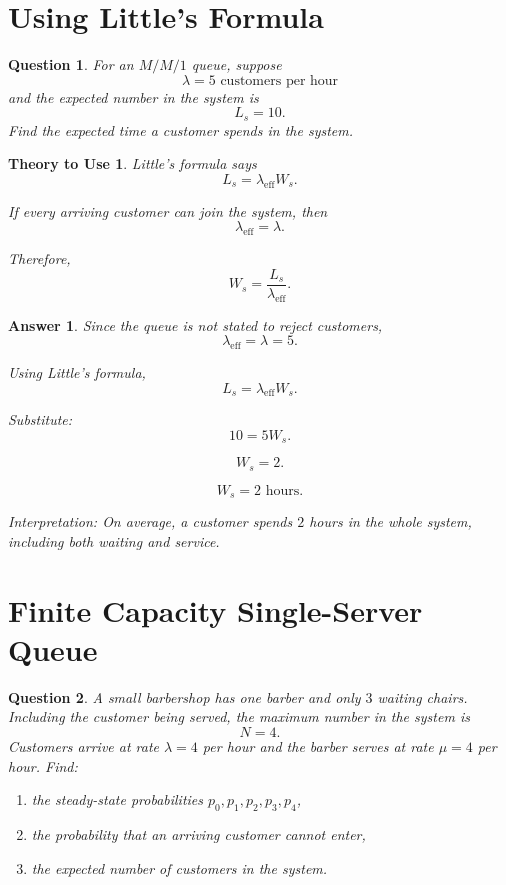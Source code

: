 \documentclass[12pt]{article}
\newtheorem{question}{Question}
\newtheorem*{theory}{Theory to Use}
\newtheorem*{answer}{Answer}
\begin{document}
\section{Using Little's Formula}

\begin{question}
For an \(M/M/1\) queue, suppose
\[
\lambda=5\text{ customers per hour}
\]
and the expected number in the system is
\[
L_s=10.
\]
Find the expected time a customer spends in the system.
\end{question}

\begin{theory}
Little's formula says
\[
L_s=\lambda_{\text{eff}}W_s.
\]

If every arriving customer can join the system, then
\[
\lambda_{\text{eff}}=\lambda.
\]

Therefore,
\[
W_s=\frac{L_s}{\lambda_{\text{eff}}}.
\]
\end{theory}

\begin{answer}
Since the queue is not stated to reject customers,
\[
\lambda_{\text{eff}}=\lambda=5.
\]

Using Little's formula,
\[
L_s=\lambda_{\text{eff}}W_s.
\]

Substitute:
\[
10=5W_s.
\]

\[
W_s=2.
\]

\[
\boxed{W_s=2\text{ hours}.}
\]

Interpretation: On average, a customer spends \(2\) hours in the whole system, including both waiting and service.
\end{answer}

\section{Finite Capacity Single-Server Queue}

\begin{question}
A small barbershop has one barber and only \(3\) waiting chairs.
Including the customer being served, the maximum number in the system is
\[
N=4.
\]
Customers arrive at rate \(\lambda=4\) per hour and the barber serves at rate \(\mu=4\) per hour.
Find:
\begin{enumerate}[label=(\alph*)]
    \item the steady-state probabilities \(p_0,p_1,p_2,p_3,p_4\),
    \item the probability that an arriving customer cannot enter,
    \item the expected number of customers in the system.
\end{enumerate}
\end{question}
\end{document}
